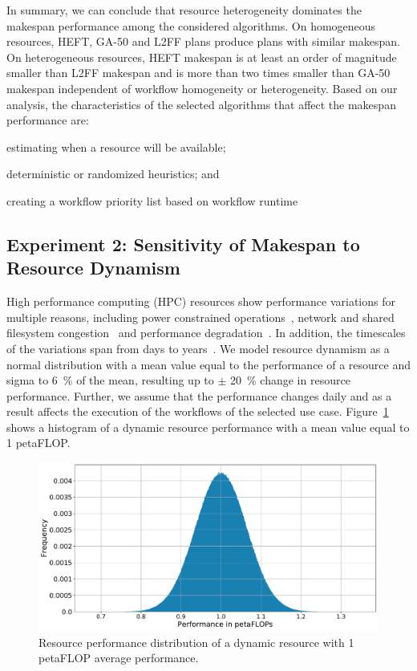 In summary, we can conclude that resource heterogeneity dominates the makespan performance among the considered algorithms.
On homogeneous resources, HEFT, GA-50 and L2FF plans produce plans with similar makespan.
On heterogeneous resources, HEFT makespan is at least an order of magnitude smaller than L2FF makespan and is more than two times smaller than GA-50 makespan independent of workflow homogeneity or heterogeneity.
Based on our analysis, the characteristics of the selected algorithms that affect the makespan performance are:
\begin{inparaenum}[1)]
    \item estimating when a resource will be available;
    \item deterministic or randomized heuristics; and
    \item creating a workflow priority list based on workflow runtime
\end{inparaenum}

\subsection{Experiment 2: Sensitivity of Makespan to Resource Dynamism}

High performance computing (HPC) resources show performance variations for multiple reasons, including power constrained operations~\cite{inadomi2015analyzing}, network and shared filesystem congestion~\cite{brown2018interference} and performance degradation~\cite{wu2017survey}.
In addition, the timescales of the variations span from days to years~\cite{skinner2005understanding}.
We model resource dynamism as a normal distribution with a mean value equal to the performance of a resource and sigma to 6~\% of the mean, resulting up to $\pm$ 20~\% change in resource performance.
Further, we assume that the performance changes daily and as a result affects the execution of the workflows of the selected use case.
Figure~\ref{fig:dynamic_res} shows a histogram of a dynamic resource performance with a mean value equal to 1 petaFLOP.

\begin{figure}[t]
    \centering
    \includegraphics[width=.75\textwidth]{figures/campaign/DynRes.pdf}
    \caption{Resource performance distribution of a dynamic resource with 1 petaFLOP average performance.}
    \label{fig:dynamic_res}
\end{figure}

